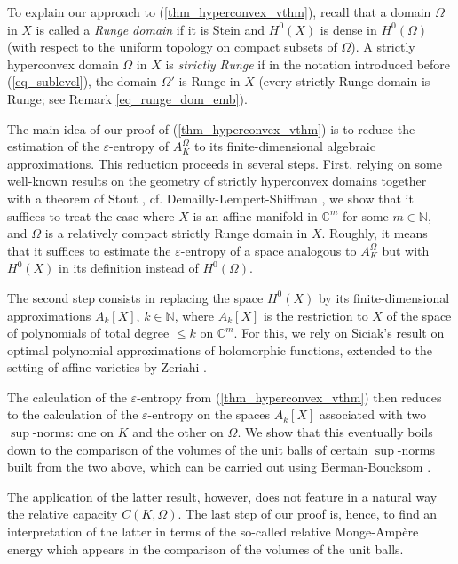 \documentclass[12pt]{article}
\numberwithin{equation}{section}
\theoremstyle{theorem}
\theoremstyle{definition}
\theoremstyle{remark}
\newcommand{\comp}{\mathbb{C}}
\newcommand{\nat}{\mathbb{N}}
\begin{document}
	\par 
	To explain our approach to (\ref{thm_hyperconvex_vthm}), recall that a domain $\Omega$ in $X$ is called a \textit{Runge domain} if it is Stein and $H^0(X)$ is dense in $H^0(\Omega)$ (with respect to the uniform topology on compact subsets of $\Omega$).
	A strictly hyperconvex domain $\Omega$ in $X$ is \textit{strictly Runge} if in the notation introduced before (\ref{eq_sublevel}), the domain $\Omega'$ is Runge in $X$ (every strictly Runge domain is Runge; see Remark \ref{eq_runge_dom_emb}).
	\par
	The main idea of our proof of (\ref{thm_hyperconvex_vthm}) is to reduce the estimation of the $\varepsilon$-entropy of $A_K^{\Omega}$ to its finite-dimensional algebraic approximations.
	This reduction proceeds in several steps. 
	First, relying on some well-known results on the geometry of strictly hyperconvex domains together with a theorem of Stout \cite{StoutStein}, cf. Demailly-Lempert-Shiffman \cite{DemLempShiff}, we show that it suffices to treat the case where $X$ is an affine manifold in $\comp^m$ for some $m \in \nat$, and $\Omega$ is a relatively compact strictly Runge domain in $X$.
	Roughly, it means that it suffices to estimate the $\varepsilon$-entropy of a space analogous to $A_K^{\Omega}$ but with $H^0(X)$ in its definition instead of $H^0(\Omega)$.
	\par 
	The second step consists in replacing the space $H^0(X)$ by its finite-dimensional approximations $A_k[X]$, $k \in \nat$, where $A_k[X]$ is the restriction to $X$ of the space of polynomials of total degree $\leq k$ on $\comp^m$.
	For this, we rely on Siciak's \cite{SiciakEnvFirst} result on optimal polynomial approximations of holomorphic functions, extended to the setting of affine varieties by Zeriahi \cite{ZeriahiSic}.
	\par 
	The calculation of the $\varepsilon$-entropy from (\ref{thm_hyperconvex_vthm}) then reduces to the calculation of the $\varepsilon$-entropy on the spaces $A_k[X]$ associated with two $\sup$-norms: one on $K$ and the other on $\Omega$.
	We show that this eventually boils down to the comparison of the volumes of the unit balls of certain $\sup$-norms built from the two above, which can be carried out using Berman-Boucksom \cite{BermanBouckBalls}.
	\par 
	The application of the latter result, however, does not feature in a natural way the relative capacity $C(K, \Omega)$. 
	The last step of our proof is, hence, to find an interpretation of the latter in terms of the so-called relative Monge-Ampère energy which appears in the comparison of the volumes of the unit balls.
\end{document}
